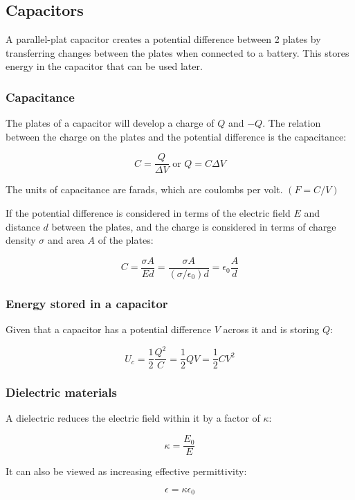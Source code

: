 \documentclass[12pt]{article}
\begin{document}
\subsection{Capacitors}

A parallel-plat capacitor creates a potential difference between 2 plates by transferring changes between the plates when connected to a battery.
This stores energy in the capacitor that can be used later.

\subsubsection{Capacitance}

The plates of a capacitor will develop a charge of $Q$ and $-Q$.
The relation between the charge on the plates and the potential difference is the capacitance:

\[
\boxed{
C = \frac{Q}{\Delta V}
}\text{ or }
\boxed{Q = C \Delta V}
\]

The units of capacitance are farads, which are coulombs per volt. $(F = C/V)$

If the potential difference is considered in terms of the electric field $E$ and distance $d$ between the plates, and the charge is considered in terms of charge density $\sigma$ and area $A$ of the plates:

\[
\boxed{
C = \frac{\sigma A}{Ed} = \frac{\sigma A}{(\sigma / \epsilon_0) d} =\epsilon_0 \frac{A}{d}
}
\]

\subsubsection{Energy stored in a capacitor}

Given that a capacitor has a potential difference $V$ across it and is storing $Q$:

\[
\boxed{
U_c = \frac{1}{2}\frac{Q^2}{C} = \frac{1}{2}QV = \frac{1}{2}CV^2
}
\]

\subsubsection{Dielectric materials}

A dielectric reduces the electric field within it by a factor of $\kappa$:

\[
\boxed{
\kappa = \frac{E_0}{E}
}
\]

It can also be viewed as increasing effective permittivity:

\[
\boxed{
\epsilon = \kappa \epsilon_0
}
\]
\end{document}
